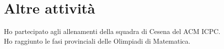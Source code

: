 \documentclass[curriculum-vitae-ita]{subfiles}
\begin{document}
	\section*{Altre attività}
		 Ho partecipato agli allenamenti della squadra di Cesena del ACM ICPC.\\

		 Ho raggiunto le fasi provinciali delle Olimpiadi di Matematica.
	
\end{document}
